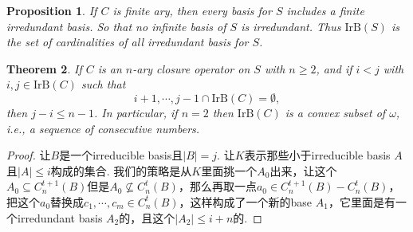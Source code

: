 \documentclass{article}
\newtheorem{theorem}{Theorem}[section]
\newtheorem{proposition}[theorem]{Proposition}
\begin{document}
\begin{proposition}
\rm If $C$ is finite ary, then every basis for $S$ includes a finite irredundant basis. So that no infinite basis of $S$ is irredundant. Thus $\text{IrB}(S)$ is the set of cardinalities of all irredundant basis for $S$.
\end{proposition}


\begin{theorem}
\rm If $C$ is an $n$-ary closure operator on $S$ with $n \geq 2$, and if $i < j$ with $i, j \in \text{IrB}(C)$ such that 
$$
{i+1,\cdots,j-1} \cap \text{IrB}(C) = \emptyset,
$$
then $j-i \leq n-1$. In particular, if $n=2$ then $\text{IrB}(C)$ is a convex subset of $\omega$, i.e., a sequence of consecutive numbers. 
\end{theorem}

\begin{proof}
让$B$是一个irreducible basis且$|B| = j$. 让$K$表示那些小于irreducible basis $A$且$|A| \leq i$构成的集合. 我们的策略是从$K$里面挑一个$A_0$出来，让这个$A_0 \subseteq C_n^{t+1}(B)$但是$A_0 \nsubseteq C_n^{t}(B)$，那么再取一点$a_0 \in C_n^{t+1}(B) - C_n^{t}(B)$，把这个$a_0$替换成$c_1,\cdots,c_m \in C_n^{t}(B)$，这样构成了一个新的base $A_1$，它里面是有一个irredundant basis $A_2$的，且这个$|A_2| \leq i+n$的.
\end{proof}
\end{document}
